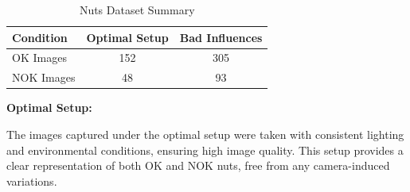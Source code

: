 \documentclass[12pt,DIV14,BCOR12mm,a4paper,footinclude=false,headinclude,parskip=half-,twoside,openright,cleardoublepage=empty,toc=index,bibliography=totoc,listof=totoc]{scrreprt}
\numberwithin{equation}{chapter}
\begin{document}
\begin{table}
    \centering
    \caption{Nuts Dataset Summary}
    \label{tab:nuts-dataset}
    \begin{tabular}{lcc}
        \toprule
        \textbf{Condition} & \textbf{Optimal Setup} & \textbf{Bad Influences} \\ 
        \midrule
        OK Images          & 152                    & 305                     \\ 
        NOK Images         & 48                     & 93                      \\ 
        \bottomrule
    \end{tabular}
\end{table}


\textbf{Optimal Setup:}

The images captured under the optimal setup were taken with consistent lighting and environmental conditions, ensuring high image quality. This setup provides a clear representation of both OK and NOK nuts, free from any camera-induced variations.
\end{document}
